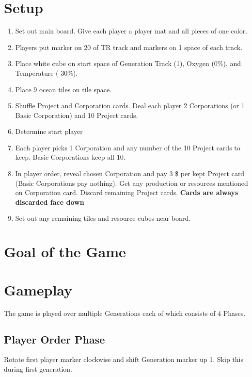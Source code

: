 \documentclass[12pt]{article}
\newenvironment{enumerateCustom}
{\begin{enumerate}
  \setlength{\itemsep}{1pt}
  \setlength{\parskip}{0pt}
  \setlength{\parsep}{0pt}}
{\end{enumerate}}
\begin{document}
\begin{multicols*}{2}

\section*{Setup}
    \begin{enumerateCustom}
        \item Set out main board. Give each player a player mat and all pieces of one color.
        \item Players put marker on 20 of TR track and markers on 1 space of each track.
        \item Place white cube on start space of Generation Track (1), Oxygen (0\%), and Temperature (-30\%).
        \item Place 9 ocean tiles on tile space.
        \item Shuffle Project and Corporation cards. Deal each player 2 Corporations (or 1 Basic Corporation) and 10 Project cards.
        \item Determine start player
        \item Each player picks 1 Corporation and any number of the 10 Project cards to keep. Basic Corporations keep all 10.
        \item In player order, reveal chosen Corporation and pay 3 \$ per kept Project card (Basic Corporations pay nothing). Get any production or resources mentioned on Corporation card. Discard remaining Project cards. \textbf{Cards are always discarded face down}
        \item Set out any remaining tiles and resource cubes near board.
    \end{enumerateCustom}

\section*{Goal of the Game}

\section*{Gameplay}
The game is played over multiple Generations each of which consists of 4 Phases.

    \subsection*{Player Order Phase}
    Rotate first player marker clockwise and shift Generation marker up 1. Skip this during first generation.


\end{multicols*}
\end{document}

